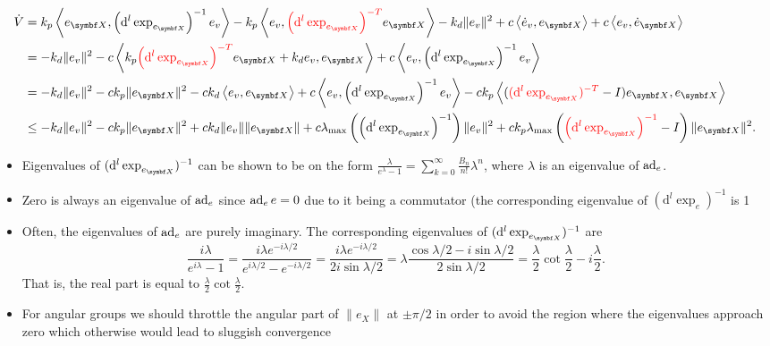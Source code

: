 \begin{equation*}
  \begin{aligned}
    \dot V &= k_p \left \langle e_\X, \left( \mathrm{d}^l \exp_{e_\X} \right)^{-1} e_v \right \rangle - k_p \left \langle e_v,  \textcolor{red}{\left( \mathrm{d}^l \exp_{e_\X} \right)^{-T}} e_\X \right \rangle - k_d \| e_v \|^2 + c \left \langle \dot e_v, e_\X \right \rangle + c \left \langle e_v, \dot e_\X \right \rangle \\
    & = - k_d \| e_v \|^2 - c \left \langle k_p \textcolor{red}{\left( \mathrm{d}^l \exp_{e_\X} \right)^{-T}} e_\X + k_d e_v, e_\X \right \rangle + c \left \langle e_v, \left(\mathrm{d}^l \exp_{e_\X} \right)^{-1} e_v \right \rangle \\
    & = -k_d \| e_v \|^2 - c k_p \| e_\X \|^2 - c k_d \left \langle e_v, e_\X \right \rangle + c \left \langle e_v, \left(\mathrm{d}^l \exp_{e_\X} \right)^{-1} e_v \right \rangle - c k_p \left \langle ( \textcolor{red}{(\mathrm{d}^l \exp_{e_\X})^{-T}} - I) e_\X , e_\X \right \rangle \\
    & \leq -k_d \| e_v \|^2 - c k_p \| e_\X \|^2 + c k_d \| e_v \| \| e_\X \| + c \lambda_{\textrm{max}}\left( \left( \mathrm{d}^l \exp_{e_\X} \right)^{-1} \right) \| e_v \|^2 + c k_p \lambda_{\textrm{max}} \left( \textcolor{red}{\left(\mathrm{d}^l \exp_{e_\X} \right)^{-1}} - I \right) \| e_\X \|^2.
  \end{aligned}
\end{equation*}

\begin{itemize}
  \item Eigenvalues of $(\mathrm{d}^l \exp_{e_\X})^{-1}$ can be shown to be on the form $\frac{\lambda}{e^{\lambda} - 1} = \sum_{k=0}^\infty \frac{B_n}{n!} \lambda^n$, where $\lambda$ is an eigenvalue of $\operatorname{ad}_e$.
  \item Zero is always an eigenvalue of $\operatorname{ad}_e$ since $\operatorname{ad}_e e = 0$ due to it being a commutator (the corresponding eigenvalue of $(\mathrm{d}^l \exp_e)^{-1}$ is 1
  \item Often, the eigenvalues of $\operatorname{ad}_e$ are purely imaginary. The corresponding eigenvalues of $(\mathrm{d}^l \exp_{e_\X})^{-1}$ are
  \begin{equation}
    \frac{i \lambda}{e^{i \lambda} - 1} = \frac{i \lambda e^{-i \lambda / 2}}{e^{i \lambda / 2} - e^{- i \lambda / 2}} = \frac{i \lambda e^{-i \lambda / 2}}{2 i \sin \lambda / 2} = \lambda \frac{\cos \lambda / 2 - i \sin \lambda / 2}{2 \sin \lambda / 2} = \frac{\lambda}{2} \cot \frac{\lambda}{2} - i \frac{\lambda}{2}.
  \end{equation}
  That is, the real part is equal to $\frac{\lambda}{2}\cot \frac{\lambda}{2}$.
  \item For angular groups we should throttle the angular part of $\| e_X \|$ at $\pm \pi/2$ in order to avoid the region where the eigenvalues approach zero which otherwise would lead to sluggish convergence
\end{itemize}

